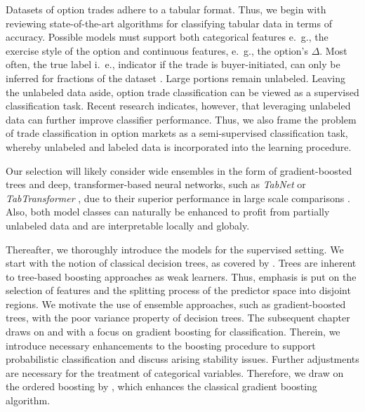 Datasets of option trades adhere to a tabular format.  Thus, we begin with reviewing state-of-the-art algorithms for classifying tabular data in terms of accuracy. Possible models must support both categorical features e.~g., the exercise style of the option and continuous features, e.~g., the option's $\Delta$. Most often, the true label i.~e., indicator if the trade is buyer-initiated, can only be inferred for fractions of the dataset \autocites{grauerOptionTradeClassification2022}{savickasInferringDirectionOption2003}. Large portions remain unlabeled. Leaving the unlabeled data aside, option trade classification can be viewed as a supervised classification task. Recent research \autocites{arikTabNetAttentiveInterpretable2020}{huangTabTransformerTabularData2020}{yoonVIMEExtendingSuccess2020} indicates, however, that leveraging unlabeled data can further improve classifier performance. Thus, we also frame the problem of trade classification in option markets as a semi-supervised classification task, whereby unlabeled and labeled data is incorporated into the learning procedure. 

Our selection will likely consider wide ensembles in the form of gradient-boosted trees and deep, transformer-based neural networks, such as \emph{TabNet} \autocite{arikTabNetAttentiveInterpretable2020} or \emph{TabTransformer} \autocite{huangTabTransformerTabularData2020}, due to their superior performance in large scale comparisons \autocites{borisovDeepNeuralNetworks2022}{gorishniyRevisitingDeepLearning2021}{grinsztajnWhyTreebasedModels2022}{shwartz-zivTabularDataDeep2021}. Also, both model classes can naturally be enhanced to profit from partially unlabeled data and are interpretable locally and globaly. 

Thereafter, we thoroughly introduce the models for the supervised setting. We start with the notion of classical decision trees, as covered by \textcite{breimanClassificationRegressionTrees2017}. Trees are inherent to tree-based boosting approaches as weak learners. Thus, emphasis is put on the selection of features and the splitting process of the predictor space into disjoint regions. We motivate the use of ensemble approaches, such as gradient-boosted trees, with the poor variance property of decision trees. The subsequent chapter draws on \textcite{hastietrevorElementsStatisticalLearning2009} and \textcite{friedmanGreedyFunctionApproximation2001} with a focus on gradient boosting for classification. Therein, we introduce necessary enhancements to the boosting procedure to support probabilistic classification and discuss arising stability issues. Further adjustments are necessary for the treatment of categorical variables. Therefore, we draw on the ordered boosting by \textcite{prokhorenkovaCatBoostUnbiasedBoosting2018}, which enhances the classical gradient boosting algorithm.

